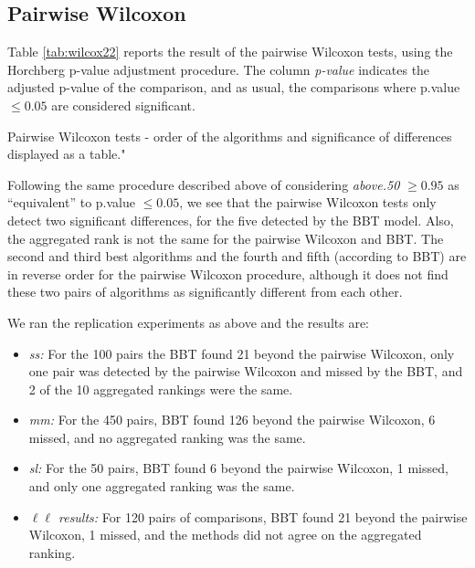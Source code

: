 \documentclass[twoside,11pt,preprint]{article}
\begin{document}
\hypertarget{pairwise-wilcoxon}{%
\subsection{\texorpdfstring{Pairwise Wilcoxon \label{sec:comp-wil}}{Pairwise Wilcoxon }}\label{pairwise-wilcoxon}}

Table \ref{tab:wilcox22} reports the result of the pairwise Wilcoxon
tests, using the Horchberg p-value adjustment procedure. The column
{\em p-value} indicates the adjusted p-value of the comparison, and as
usual, the comparisons where p.value \(\le 0.05\) are considered
significant.

\begin{table}[ht]
\centering
{}\quad
{}
\caption{Pairwise Wilcoxon tests - order of the algorithms and significance of differences displayed as a table."}
\label{tab:wilcox22}
\end{table}

Following the same procedure described above of considering
{\em above.50} \(\ge 0.95\) as ``equivalent'' to p.value \(\le 0.05\), we
see that the pairwise Wilcoxon tests only detect two significant
differences, for the five detected by the BBT model. Also, the
aggregated rank is not the same for the pairwise Wilcoxon and BBT. The
second and third best algorithms and the fourth and fifth (according
to BBT) are in reverse order for the pairwise Wilcoxon procedure,
although it does not find these two pairs of algorithms as
significantly different from each other.

We ran the replication experiments as above and
the results are:

\begin{itemize}
\item
  \emph{ss:} For the 100 pairs the BBT found 21 beyond the pairwise
  Wilcoxon, only one pair was detected by the pairwise Wilcoxon and
  missed by the BBT, and 2 of the 10 aggregated rankings were the
  same.
\item
  \emph{mm:} For the 450 pairs, BBT found 126 beyond the pairwise
  Wilcoxon, 6 missed, and no aggregated ranking was the same.
\item
  \emph{sl:} For the 50 pairs, BBT found 6 beyond the pairwise Wilcoxon,
  1 missed, and only one aggregated ranking was the same.
\item
  \emph{$\ell\ell$ results:} For 120 pairs of comparisons, BBT found 21 beyond
  the pairwise Wilcoxon, 1 missed, and the methods did not agree on
  the aggregated ranking.
\end{itemize}
\end{document}
